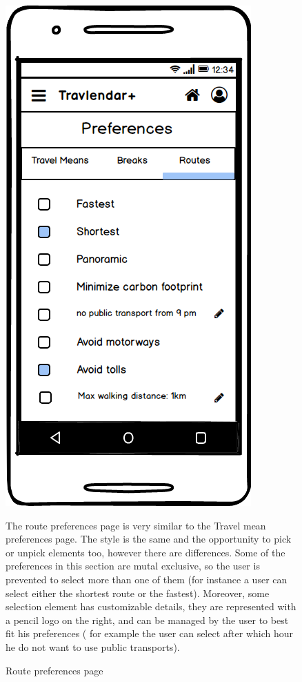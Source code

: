 \documentclass[11pt]{article}
\begin{document}
		\begin{figure}
		\centering
		\includegraphics[width=0.7\linewidth]{PreferencesRoutes.png}
		\caption{Route preferences page}
		\label{fig:preferencesroutes}
		\begin{center}
			The route preferences page is very similar to the Travel mean preferences page. The style is the same and the opportunity to pick or unpick elements too, however there are differences. Some of the preferences in this section are mutal exclusive, so the user is prevented to select more than one of them (for instance a user can select either the shortest route or the fastest). Moreover, some selection element has customizable details, they are represented with a pencil logo on the right, and can be managed by the user to best fit his preferences ( for example the user can select after which hour he do not want to use public transports).
		\end{center}
	\end{figure}
	

	
\end{document}
